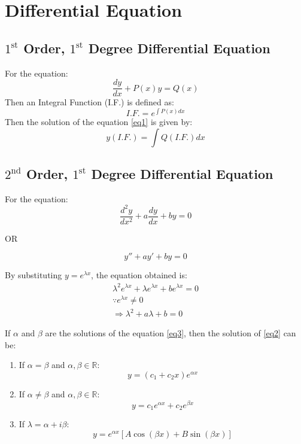 \chapter{Differential Equation}
\section{$1^\text{st}$ Order, $1^\text{st}$ Degree Differential Equation}
For the equation:
\begin{equation}
	\dfrac{dy}{dx}+P(x)y=Q(x)\label{eq1}
\end{equation}
Then an Integral Function (I.F.) is defined as:
\begin{equation}
	I.F.=e^{\int P(x)dx}
\end{equation}
Then the solution of the equation \ref{eq1} is given by:
\begin{equation}
	y(I.F.)=\int Q (I.F.) dx
\end{equation}


\section{$2^\text{nd}$ Order, $1^\text{st}$ Degree Differential Equation}
For the equation:
\begin{equation}
	\dfrac{d^2 y}{dx^2}+a\dfrac{dy}{dx}+by=0\label{eq2}
\end{equation}
\begin{center}
	OR
\end{center}
\begin{equation}
	y''+ay'+by=0
\end{equation}

By substituting $y=e^{\lambda x}$, the equation obtained is:
\begin{align}
	\lambda^2 e^{\lambda x}+\lambda e^{\lambda x}+be^{\lambda x}=0\nonumber\\
	\because e^{\lambda x} \neq 0\nonumber\\
	\Rightarrow \lambda^2+a\lambda+b=0\label{eq3}
\end{align}

If $\alpha$ and $\beta$ are the solutions of the equation \ref{eq3}, then the solution of \ref{eq2} can be:
\begin{enumerate}

	\item If $\alpha = \beta$ and $\alpha,\beta\in\mathbb{R}$:
	\begin{equation}
		y=(c_1+c_2x)e^{\alpha x}
	\end{equation}

	\item If $\alpha \neq \beta$ and $\alpha,\beta\in\mathbb{R}$:
	\begin{equation}
		y=c_1 e^{\alpha x}+c_2 e^{\beta x}
	\end{equation}

	\item If $\lambda = \alpha + i \beta$:
	\begin{equation}
		y=e^{\alpha x}\left[A\cos (\beta x)+B\sin (\beta x) \right]
	\end{equation}
\end{enumerate}



